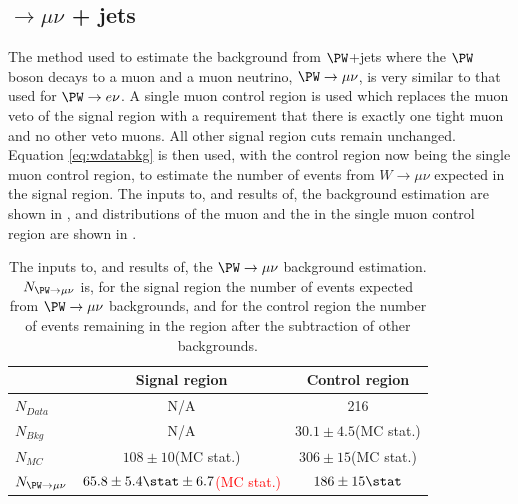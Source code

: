 \subsection{\PW$\rightarrow \mu\nu$ + jets}
\label{sec:promptwmunu}
The method used to estimate the background from $\PW$+jets where the $\PW$ boson decays to a muon and a muon neutrino, $\PW\rightarrow\mu\nu$, is very similar to that used for $\PW\rightarrow e\nu$. A single muon control region is used which replaces the muon veto of the signal region with a requirement that there is exactly one tight muon and no other veto muons. All other signal region cuts remain unchanged. Equation \ref{eq:wdatabkg} is then used, with the control region now being the single muon control region, to estimate the number of events from $W\rightarrow\mu\nu$ expected in the signal region. The inputs to, and results of, the background estimation are shown in , and distributions of the muon \pt and the \METnoMU in the single muon control region are shown in .

\begin{table}
  \caption{The inputs to, and results of, the $\PW\rightarrow \mu\nu$ background estimation. $N_{\PW\rightarrow \mu\nu}$ is, for the signal region the number of events expected from $\PW\rightarrow \mu\nu$ backgrounds, and for the control region the number of events remaining in the region after the subtraction of other backgrounds.}
  \label{tab:promptwmunu}
  \begin{tabular}{lcc}
    \hline
    \hline
    & Signal region & Control region \\
    \hline
    \hline
    $N_{Data}$ & N/A & 216\\
    $N_{Bkg}$ & N/A & $30.1\pm 4.5$(\ac{MC} stat.) \\
    $N_{MC}$& $108\pm 10$(\ac{MC} stat.) & $306\pm 15$(\ac{MC} stat.) \\
    \hline
    $N_{\PW\rightarrow \mu\nu}$& \textcolor{red}{$65.8\pm 5.4\stat\pm 6.7$(MC stat.)} & $186\pm 15\stat$ \\
    \hline
    \hline
  \end{tabular}
\end{table}

